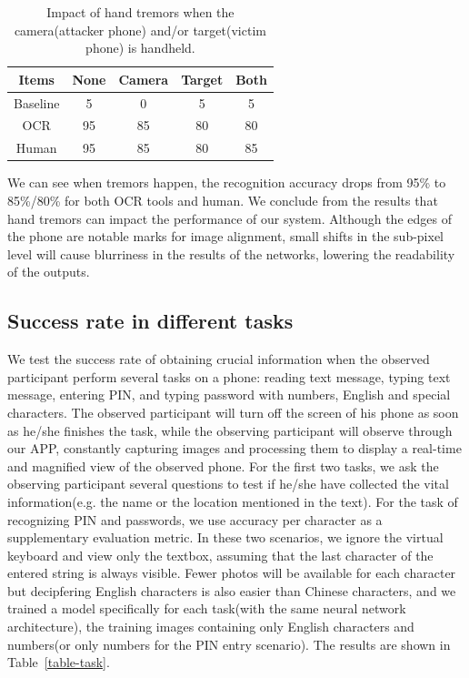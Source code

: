 \begin{table}[!t] 
    \centering
    \caption{Impact of hand tremors when the camera(attacker phone) and/or target(victim phone) is handheld.}
    \begin{tabular}{ccccc}
        \toprule
    Items & None & Camera & Target & Both  \\
    \midrule
    Baseline & 5 & 0 & 5& 5\\ 
    \midrule
    OCR & 95 & 85 & 80 & 80\\ 
    Human & 95 & 85 & 80 & 85\\ \bottomrule
    \end{tabular}
    \label{table-tremor}
\end{table}

We can see when tremors happen, the recognition accuracy drops from 95\% to 85\%/80\% for both OCR tools and human. We conclude from the results that hand tremors can impact the performance of our system. Although the edges of the phone are notable marks for image alignment, small shifts in the sub-pixel level will cause blurriness in the results of the networks, lowering the readability of the outputs. 


\subsection{Success rate in different tasks}
We test the success rate of obtaining crucial information when the observed participant perform several tasks on a phone: reading text message, typing text message, entering PIN, and typing password with numbers, English and special characters. The observed participant will turn off the screen of his phone as soon as he/she finishes the task, while the observing participant will observe through our APP, constantly capturing images and processing them to display a real-time and magnified view of the observed phone. For the first two tasks, we ask the observing participant several questions to test if he/she have collected the vital information(e.g. the name or the location mentioned in the text). For the task of recognizing PIN and passwords, we use accuracy per character as a supplementary evaluation metric. In these two scenarios, we ignore the virtual keyboard and view only the textbox, assuming that the last character of the entered string is always visible. Fewer photos will be available for each character but decipfering English characters is also easier than Chinese characters, and we trained a model specifically for each task(with the same neural network architecture), the training images containing only English characters and numbers(or only numbers for the PIN entry scenario). The results are shown in Table~\ref{table-task}.

